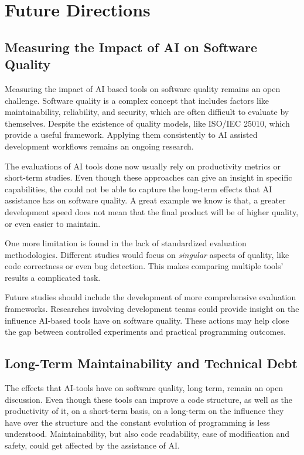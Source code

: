\chapter{Future Directions}

\section{Measuring the Impact of AI on Software Quality}

Measuring the impact of AI based tools on software quality remains an open challenge. Software quality is a complex concept that includes factors like maintainability, reliability, and security, which are often difficult to evaluate by themselves. Despite the existence of quality models, like ISO/IEC 25010, which provide a useful framework. Applying them consistently to AI assisted development workflows remains an ongoing research.

The evaluations of AI tools done now usually rely on productivity metrics or short-term studies. Even though these approaches can give an insight in specific capabilities, the could not be able to capture the long-term effects that AI assistance has on software quality. A great example we know is that, a greater development speed does not mean that the final product will be of higher quality, or even easier to maintain.

One more limitation is found in the lack of standardized evaluation methodologies. Different studies would focus on \textit{singular} aspects of quality, like code correctness or even bug detection. This makes comparing multiple tools' results a complicated task.

Future studies should include the development of more comprehensive evaluation frameworks. Researches involving development teams could provide insight on the influence AI-based tools have on software quality. These actions may help close the gap between controlled experiments and practical programming outcomes.

\section{Long-Term Maintainability and Technical Debt}

The effects that AI-tools have on software quality, long term, remain an open discussion. Even though these tools can improve a code structure, as well as the productivity of it, on a short-term basis, on a long-term on the influence they have over the structure and the constant evolution of programming is less understood. Maintainability, but also code readability, ease of modification and safety, could get affected by the assistance of AI.

